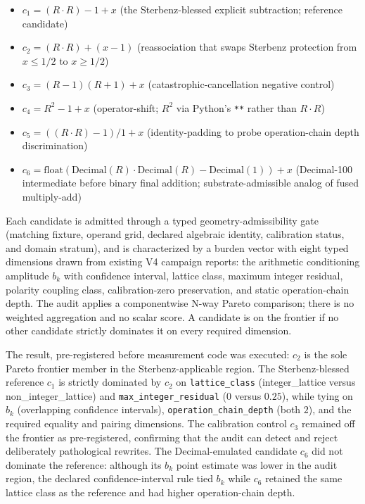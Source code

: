 \documentclass[11pt,a4paper]{article}
\begin{document}
\begin{itemize}
    \item $c_1 = (R \cdot R) - 1 + x$ \quad (the Sterbenz-blessed explicit subtraction; reference candidate)
    \item $c_2 = (R \cdot R) + (x - 1)$ \quad (reassociation that swaps Sterbenz protection from $x \le 1/2$ to $x \ge 1/2$)
    \item $c_3 = (R - 1)(R + 1) + x$ \quad (catastrophic-cancellation negative control)
    \item $c_4 = R^2 - 1 + x$ \quad (operator-shift; $R^2$ via Python's \texttt{**} rather than $R \cdot R$)
    \item $c_5 = ((R \cdot R) - 1)/1 + x$ \quad (identity-padding to probe operation-chain depth discrimination)
    \item $c_6 = \mathrm{float}(\mathrm{Decimal}(R)\cdot\mathrm{Decimal}(R) - \mathrm{Decimal}(1)) + x$ \quad (Decimal-100 intermediate before binary final addition; substrate-admissible analog of fused multiply-add)
\end{itemize}

Each candidate is admitted through a typed geometry-admissibility gate (matching fixture, operand grid, declared algebraic identity, calibration status, and domain stratum), and is characterized by a burden vector with eight typed dimensions drawn from existing V4 campaign reports: the arithmetic conditioning amplitude $b_k$ with confidence interval, lattice class, maximum integer residual, polarity coupling class, calibration-zero preservation, and static operation-chain depth. The audit applies a componentwise N-way Pareto comparison; there is no weighted aggregation and no scalar score. A candidate is on the frontier if no other candidate strictly dominates it on every required dimension.

The result, pre-registered before measurement code was executed: $c_2$ is the sole Pareto frontier member in the Sterbenz-applicable region. The Sterbenz-blessed reference $c_1$ is strictly dominated by $c_2$ on \texttt{lattice\_class} (integer\_lattice versus non\_integer\_lattice) and \texttt{max\_integer\_residual} ($0$ versus $0.25$), while tying on $b_k$ (overlapping confidence intervals), \texttt{operation\_chain\_depth} (both $2$), and the required equality and pairing dimensions. The calibration control $c_3$ remained off the frontier as pre-registered, confirming that the audit can detect and reject deliberately pathological rewrites. The Decimal-emulated candidate $c_6$ did not dominate the reference: although its $b_k$ point estimate was lower in the audit region, the declared confidence-interval rule tied $b_k$ while $c_6$ retained the same lattice class as the reference and had higher operation-chain depth.
\end{document}

